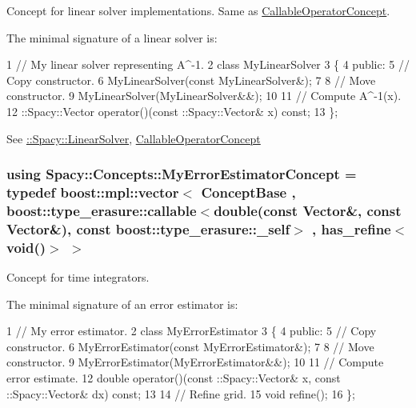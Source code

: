 Concept for linear solver implementations. Same as \hyperlink{group__ConceptGroup_gadec0c664abaacc2065dadd8b11cc8d30_CallableOperatorConceptAnchor}{Callable\+Operator\+Concept}. 

\label{group__ConceptGroup_gac7d6a94c7131c8613e2ab26fddeb50bd_LinearSolverConceptAnchor}%
\hypertarget{group__ConceptGroup_gac7d6a94c7131c8613e2ab26fddeb50bd_LinearSolverConceptAnchor}{}%
The minimal signature of a linear solver is\+: 
\begin{DoxyCode}
1 // My linear solver representing A^-1.
2 class MyLinearSolver
3 \{
4 public:
5   // Copy constructor.
6   MyLinearSolver(const MyLinearSolver&);
7 
8   // Move constructor.
9   MyLinearSolver(MyLinearSolver&&);
10 
11   // Compute A^-1(x).
12   ::Spacy::Vector operator()(const ::Spacy::Vector& x) const;
13 \};
\end{DoxyCode}


See \hyperlink{namespaceSpacy_a7d5cd1c6fb9dd85aa345b536caf30bba_LinearSolverAnchor}{\+:\+:Spacy\+:\+:Linear\+Solver}, \hyperlink{group__ConceptGroup_gadec0c664abaacc2065dadd8b11cc8d30_CallableOperatorConceptAnchor}{Callable\+Operator\+Concept} \hypertarget{group__ConceptGroup_ga6b5c97b0e58318ef98c43a9b8a7dae08_ga6b5c97b0e58318ef98c43a9b8a7dae08}{}
\subsubsection[{My\+Error\+Estimator\+Concept}]{\setlength{\rightskip}{0pt plus 5cm}using {\bf Spacy\+::\+Concepts\+::\+My\+Error\+Estimator\+Concept} = typedef boost\+::mpl\+::vector$<$ Concept\+Base , boost\+::type\+\_\+erasure\+::callable$<$double(const Vector\&, const Vector\&), const boost\+::type\+\_\+erasure\+::\+\_\+self$>$ , has\+\_\+refine$<$void()$>$ $>$}\label{group__ConceptGroup_ga6b5c97b0e58318ef98c43a9b8a7dae08_ga6b5c97b0e58318ef98c43a9b8a7dae08}


Concept for time integrators. 

\label{group__ConceptGroup_ga6b5c97b0e58318ef98c43a9b8a7dae08_ErrorEstimatorConceptAnchor}%
\hypertarget{group__ConceptGroup_ga6b5c97b0e58318ef98c43a9b8a7dae08_ErrorEstimatorConceptAnchor}{}%
The minimal signature of an error estimator is\+: 
\begin{DoxyCode}
1 // My error estimator.
2 class MyErrorEstimator
3 \{
4 public:
5   // Copy constructor.
6   MyErrorEstimator(const MyErrorEstimator&);
7 
8   // Move constructor.
9   MyErrorEstimator(MyErrorEstimator&&);
10 
11   // Compute error estimate.
12   double operator()(const ::Spacy::Vector& x, const ::Spacy::Vector& dx) const;
13 
14   // Refine grid.
15   void refine();
16 \};
\end{DoxyCode}


